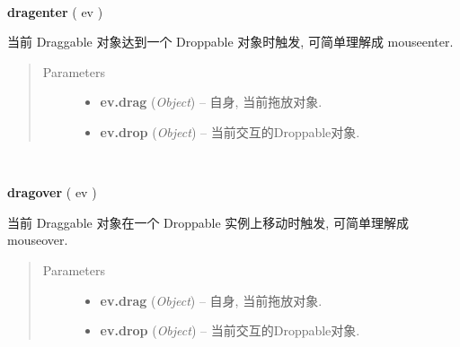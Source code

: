 \documentclass[letterpaper,10pt,english]{sphinxmanual}
\begin{document}

\begin{fulllineitems}
\label{api/component/dd/draggable:Draggable.dragenter}~
\begin{DUlineblock}{0em}
\item[] \textbf{dragenter} ( ev )
\item[] 当前 Draggable 对象达到一个 Droppable 对象时触发, 可简单理解成 mouseenter.
\end{DUlineblock}
\begin{quote}\begin{description}
\item[{Parameters}] \leavevmode\begin{itemize}
\item {}
\textbf{ev.drag} (\emph{Object}) -- 自身, 当前拖放对象.

\item {}
\textbf{ev.drop} (\emph{Object}) -- 当前交互的Droppable对象.

\end{itemize}

\end{description}\end{quote}

\end{fulllineitems}



\begin{fulllineitems}
\label{api/component/dd/draggable:Draggable.dragover}~
\begin{DUlineblock}{0em}
\item[] \textbf{dragover} ( ev )
\item[] 当前 Draggable 对象在一个 Droppable 实例上移动时触发, 可简单理解成 mouseover.
\end{DUlineblock}
\begin{quote}\begin{description}
\item[{Parameters}] \leavevmode\begin{itemize}
\item {}
\textbf{ev.drag} (\emph{Object}) -- 自身, 当前拖放对象.

\item {}
\textbf{ev.drop} (\emph{Object}) -- 当前交互的Droppable对象.

\end{itemize}

\end{description}\end{quote}

\end{fulllineitems}
\end{document}
